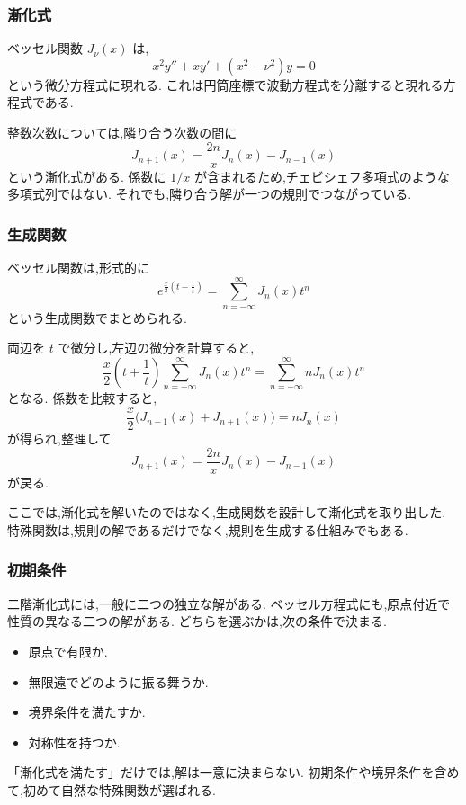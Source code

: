 \subsubsection{漸化式}

ベッセル関数 $J_\nu(x)$ は,
\[
  x^2y''+xy'+(x^2-\nu^2)y=0
\]
という微分方程式に現れる.
これは円筒座標で波動方程式を分離すると現れる方程式である.

整数次数については,隣り合う次数の間に
\[
  J_{n+1}(x)
  =\frac{2n}{x}J_n(x)-J_{n-1}(x)
\]
という漸化式がある.
係数に $1/x$ が含まれるため,チェビシェフ多項式のような多項式列ではない.
それでも,隣り合う解が一つの規則でつながっている.

\subsubsection{生成関数}

ベッセル関数は,形式的に
\[
  e^{\frac{x}{2}\left(t-\frac1t\right)}
  =\sum_{n=-\infty}^{\infty}J_n(x)t^n
\]
という生成関数でまとめられる.

両辺を $t$ で微分し,左辺の微分を計算すると,
\[
  \frac{x}{2}\left(t+\frac1t\right)
  \sum_{n=-\infty}^{\infty}J_n(x)t^n
  =
  \sum_{n=-\infty}^{\infty}nJ_n(x)t^n
\]
となる.
係数を比較すると,
\[
  \frac{x}{2}\bigl(J_{n-1}(x)+J_{n+1}(x)\bigr)
  =nJ_n(x)
\]
が得られ,整理して
\[
  J_{n+1}(x)=\frac{2n}{x}J_n(x)-J_{n-1}(x)
\]
が戻る.

ここでは,漸化式を解いたのではなく,生成関数を設計して漸化式を取り出した.
特殊関数は,規則の解であるだけでなく,規則を生成する仕組みでもある.

\subsubsection{初期条件}

二階漸化式には,一般に二つの独立な解がある.
ベッセル方程式にも,原点付近で性質の異なる二つの解がある.
どちらを選ぶかは,次の条件で決まる.

\begin{itemize}
  \item 原点で有限か.
  \item 無限遠でどのように振る舞うか.
  \item 境界条件を満たすか.
  \item 対称性を持つか.
\end{itemize}

「漸化式を満たす」だけでは,解は一意に決まらない.
初期条件や境界条件を含めて,初めて自然な特殊関数が選ばれる.

